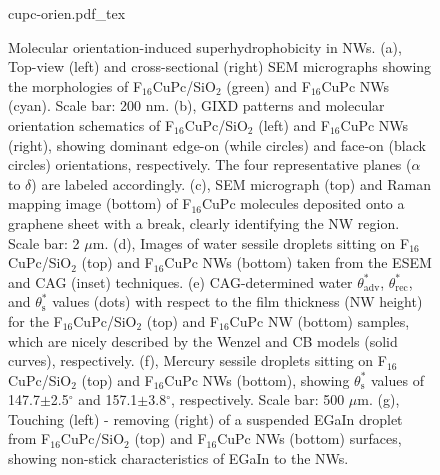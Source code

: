 \begin{figure}[htbp]
\centering
{cupc-orien.pdf_tex}
\caption{\label{fig:small-cupc-orien} Molecular orientation-induced
  superhydrophobicity in NWs. (a), Top-view (left) and cross-sectional
  (right) SEM micrographs showing the morphologies of
  F\(_{\text{16}}\)CuPc/SiO\(_{\text{2}}\) (green) and
  F\(_{\text{16}}\)CuPc NWs (cyan). Scale bar: 200 nm. (b), GIXD
  patterns and molecular orientation schematics of
  F\(_{\text{16}}\)CuPc/SiO\(_{\text{2}}\) (left) and
  F\(_{\text{16}}\)CuPc NWs (right), showing dominant edge-on (while
  circles) and face-on (black circles) orientations, respectively. The
  four representative planes (\(\alpha\) to \(\delta\)) are labeled
  accordingly. (c), SEM micrograph (top) and Raman mapping image
  (bottom) of F\(_{\text{16}}\)CuPc molecules deposited onto a
  graphene sheet with a break, clearly identifying the NW
  region. Scale bar: 2 \(\mu\)m. (d), Images of water sessile droplets
  sitting on F\(_{\text{16}}\)CuPc/SiO\(_{\text{2}}\) (top) and
  F\(_{\text{16}}\)CuPc NWs (bottom) taken from the ESEM and CAG
  (inset) techniques. (e) CAG-determined water
  \(\theta_{\mathrm{adv}}^{*}\), \(\theta_{\mathrm{rec}}^{*}\), and
  \(\theta_{\mathrm{s}}^{*}\) values (dots) with respect to the film
  thickness (NW height) for the
  F\(_{\text{16}}\)CuPc/SiO\(_{\text{2}}\) (top) and
  F\(_{\text{16}}\)CuPc NW (bottom) samples, which are nicely
  described by the Wenzel and CB models (solid curves),
  respectively. (f), Mercury sessile droplets sitting on
  F\(_{\text{16}}\)CuPc/SiO\(_{\text{2}}\) (top) and
  F\(_{\text{16}}\)CuPc NWs (bottom), showing
  \(\theta_{\mathrm{s}}^{*}\) values of 147.7\(\pm\)2.5\(^{\circ}\)
  and 157.1\(\pm\)3.8\(^{\circ}\), respectively. Scale bar: 500
  \(\mu\)m. (g), Touching (left) - removing (right) of a suspended
  EGaIn droplet from F\(_{\text{16}}\)CuPc/SiO\(_{\text{2}}\) (top)
  and F\(_{\text{16}}\)CuPc NWs (bottom) surfaces, showing non-stick
  characteristics of EGaIn to the NWs.}
\end{figure}

